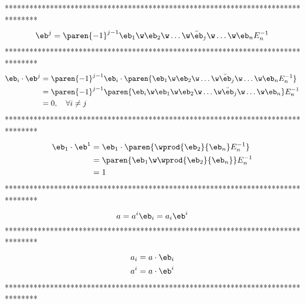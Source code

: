 ********************************************************************************
\begin{equation}\label{EQ1_61}
	\eb^{j} = \paren{-1}^{j-1}\eb_{1}\w\eb_{2}\w\dots\w\breve{\eb}_{j}\w\dots\w\eb_{n}E_{n}^{-1}
\end{equation}
********************************************************************************
\begin{align}
	\eb_{i}\cdot\eb^{j} &= \paren{-1}^{j-1}\eb_{i}\cdot\paren{\eb_{1}\w\eb_{2}\w\dots\w\breve{\eb}_{j}
							\w\dots\w\eb_{n}E_{n}^{-1}} \label{EQ1_62} \\
 						&= \paren{-1}^{j-1}\paren{\eb_{i}\w\eb_{1}\w\eb_{2}\w\dots\w\breve{\eb}_{j}
							\w\dots\w\eb_{n}}E_{n}^{-1} \label{EQ1_63} \\
						&= 0,\quad\forall i \ne j\label{EQ1_64}
\end{align}
********************************************************************************
\begin{align}
	\eb_{1}\cdot\eb^{1} & = \eb_{1}\cdot\paren{\wprod{\eb_{2}}{\eb_{n}}E_{n}^{-1}} \label{EQ1_65} \\
						& = \paren{\eb_{1}\w\wprod{\eb_{2}}{\eb_{n}}}E_{n}^{-1} \label{EQ1_66} \\
						& = 1 \label{EQ1_67}
\end{align}
********************************************************************************
\begin{equation}\label{EQ1_68}
	a = a^{i}\eb_{i} = a_{i}\eb^{i}
\end{equation}
********************************************************************************
\begin{align}
	a_{i} &= a\cdot\eb_{i} \label{EQ1_69} \\
	a^{i} &= a\cdot\eb^{i}\label{EQ1_70}
\end{align}
********************************************************************************
